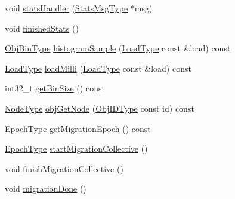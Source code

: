 \begin{DoxyCompactItemize}
\item 
void \hyperlink{structvt_1_1vrt_1_1collection_1_1lb_1_1_base_l_b_a0caca58b47838888ed2b4c3987bd9745}{stats\+Handler} (\hyperlink{structvt_1_1vrt_1_1collection_1_1lb_1_1_base_l_b_acebfe78fa7dbafe6e9e5e5e514cda278}{Stats\+Msg\+Type} $\ast$msg)
\item 
void \hyperlink{structvt_1_1vrt_1_1collection_1_1lb_1_1_base_l_b_a4bfffbc4de6887a89f5ec5561a7bccdd}{finished\+Stats} ()
\item 
\hyperlink{structvt_1_1vrt_1_1collection_1_1lb_1_1_base_l_b_ae0bff8fcf0dec0abc1d81836cf1d060a}{Obj\+Bin\+Type} \hyperlink{structvt_1_1vrt_1_1collection_1_1lb_1_1_base_l_b_a73ede03ca02dc385fcde2bd067978a4a}{histogram\+Sample} (\hyperlink{structvt_1_1vrt_1_1collection_1_1lb_1_1_base_l_b_a215e22b9f12678303f49615ae3be05cc}{Load\+Type} const \&load) const
\item 
\hyperlink{structvt_1_1vrt_1_1collection_1_1lb_1_1_base_l_b_a215e22b9f12678303f49615ae3be05cc}{Load\+Type} \hyperlink{structvt_1_1vrt_1_1collection_1_1lb_1_1_base_l_b_a9293a46022910a7b0b93938dfb886477}{load\+Milli} (\hyperlink{structvt_1_1vrt_1_1collection_1_1lb_1_1_base_l_b_a215e22b9f12678303f49615ae3be05cc}{Load\+Type} const \&load) const
\item 
int32\+\_\+t \hyperlink{structvt_1_1vrt_1_1collection_1_1lb_1_1_base_l_b_ae09296e84f0ffec68a169dcec197ec26}{get\+Bin\+Size} () const
\item 
\hyperlink{namespacevt_a866da9d0efc19c0a1ce79e9e492f47e2}{Node\+Type} \hyperlink{structvt_1_1vrt_1_1collection_1_1lb_1_1_base_l_b_a9c01cfa62a37b6c1fd9b2d8791bbcacc}{obj\+Get\+Node} (\hyperlink{structvt_1_1vrt_1_1collection_1_1lb_1_1_base_l_b_a15a2f756b59c8c2437985206b32aa403}{Obj\+I\+D\+Type} const id) const
\item 
\hyperlink{namespacevt_a985a5adf291c34a3ca263b3378388236}{Epoch\+Type} \hyperlink{structvt_1_1vrt_1_1collection_1_1lb_1_1_base_l_b_a1e088f794f3addbffd867cbe8f1a797d}{get\+Migration\+Epoch} () const
\item 
\hyperlink{namespacevt_a985a5adf291c34a3ca263b3378388236}{Epoch\+Type} \hyperlink{structvt_1_1vrt_1_1collection_1_1lb_1_1_base_l_b_ad95ab3276ed8da0811b3534668127f84}{start\+Migration\+Collective} ()
\item 
void \hyperlink{structvt_1_1vrt_1_1collection_1_1lb_1_1_base_l_b_a682072cad79474ddf1faa5ee98a85a5a}{finish\+Migration\+Collective} ()
\item 
void \hyperlink{structvt_1_1vrt_1_1collection_1_1lb_1_1_base_l_b_ac8ed2cc09aec1f84e179ba734da71960}{migration\+Done} ()

\end{DoxyCompactItemize}
